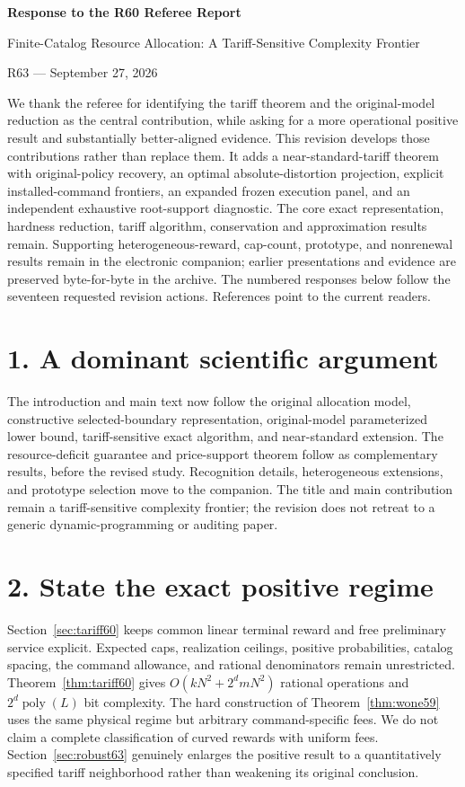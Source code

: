 \begin{center}{\Large\bfseries Response to the R60 Referee Report}\par
Finite-Catalog Resource Allocation: A Tariff-Sensitive Complexity Frontier\par
R63 --- September 27, 2026\end{center}
We thank the referee for identifying the tariff theorem and the original-model reduction as the central contribution, while asking for a more operational positive result and substantially better-aligned evidence. This revision develops those contributions rather than replace them. It adds a near-standard-tariff theorem with original-policy recovery, an optimal absolute-distortion projection, explicit installed-command frontiers, an expanded frozen execution panel, and an independent exhaustive root-support diagnostic. The core exact representation, hardness reduction, tariff algorithm, conservation and approximation results remain. Supporting heterogeneous-reward, cap-count, prototype, and nonrenewal results remain in the electronic companion; earlier presentations and evidence are preserved byte-for-byte in the archive. The numbered responses below follow the seventeen requested revision actions. References point to the current readers.

\section*{1. A dominant scientific argument}
The introduction and main text now follow the original allocation model, constructive selected-boundary representation, original-model parameterized lower bound, tariff-sensitive exact algorithm, and near-standard extension. The resource-deficit guarantee and price-support theorem follow as complementary results, before the revised study. Recognition details, heterogeneous extensions, and prototype selection move to the companion. The title and main contribution remain a tariff-sensitive complexity frontier; the revision does not retreat to a generic dynamic-programming or auditing paper.

\section*{2. State the exact positive regime}
Section~\ref{sec:tariff60} keeps common linear terminal reward and free preliminary service explicit. Expected caps, realization ceilings, positive probabilities, catalog spacing, the command allowance, and rational denominators remain unrestricted. Theorem~\ref{thm:tariff60} gives $O(kN^2+2^d mN^2)$ rational operations and $2^d\operatorname{poly}(L)$ bit complexity. The hard construction of Theorem~\ref{thm:wone59} uses the same physical regime but arbitrary command-specific fees. We do not claim a complete classification of curved rewards with uniform fees. Section~\ref{sec:robust63} genuinely enlarges the positive result to a quantitatively specified tariff neighborhood rather than weakening its original conclusion.

